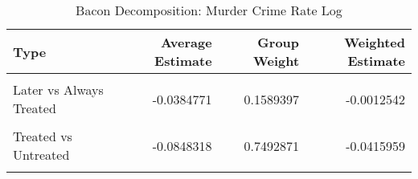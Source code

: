 \begin{table}[H]

\caption{\label{tab:tab:bacondecompositionMurder}Bacon Decomposition: Murder Crime Rate Log}
\centering
\begin{tabular}[t]{lrrr}
\toprule
Type & Average Estimate & Group Weight & Weighted Estimate\\
\midrule
\cellcolor{gray!6}{Earlier vs Later Treated} & \cellcolor{gray!6}{0.0545024} & \cellcolor{gray!6}{0.0683810} & \cellcolor{gray!6}{0.0054525}\\
Later vs Always Treated & -0.0384771 & 0.1589397 & -0.0012542\\
\cellcolor{gray!6}{Later vs Earlier Treated} & \cellcolor{gray!6}{0.0188246} & \cellcolor{gray!6}{0.0233921} & \cellcolor{gray!6}{0.0000418}\\
Treated vs Untreated & -0.0848318 & 0.7492871 & -0.0415959\\
\cellcolor{gray!6}{Total TWFE} & \cellcolor{gray!6}{NaN} & \cellcolor{gray!6}{NaN} & \cellcolor{gray!6}{-0.0373558}\\
\bottomrule
\end{tabular}
\end{table}
